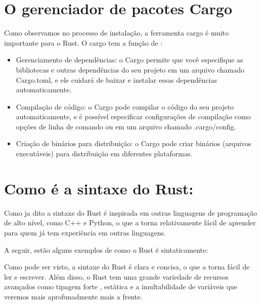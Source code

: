 \documentclass[12pt,a4paper,oneside]{abntex2}
\begin{document}
\section{O gerenciador de pacotes Cargo}
Como observamos no processo de instalação, a ferramenta cargo é muito importante para o Rust. O cargo tem a função de :
\begin{itemize}
\item Gerenciamento de dependências: o Cargo permite que você especifique as bibliotecas e outras dependências do seu projeto em um arquivo chamado Cargo.toml, e ele cuidará de baixar e instalar essas dependências automaticamente.
    \item Compilação de código: o Cargo pode compilar o código do seu projeto automaticamente, e é possível especificar configurações de compilação como opções de linha de comando ou em um arquivo chamado .cargo/config.

    \item Criação de binários para distribuição: o Cargo pode criar binários (arquivos executáveis) para distribuição em diferentes plataformas. 
\end{itemize}



\section{Como é a sintaxe do Rust:}

Como ja dito a sintaxe do Rust é inspirada em outras linguagens de programação de alto nível, como C++ e Python, o que a torna relativamente fácil de aprender para quem já tem experiência em outras linguagens.

A seguir, estão alguns exemplos de como o Rust é sintaticamente:







Como pode ser visto, a sintaxe do Rust é clara e concisa, o que a torna fácil de ler e escrever. Além disso, o Rust tem uma grande variedade de recursos avançados como tipagem forte , estática e a imultabilidade de variáveis que veremos mais aprofunadmente mais a frente.
\end{document}
